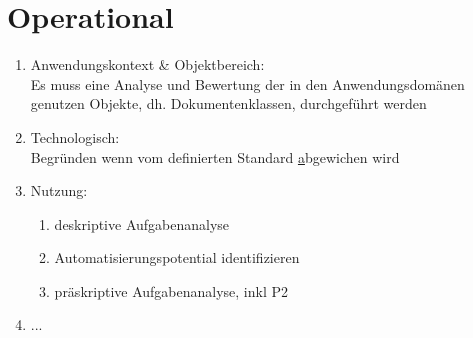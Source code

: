 %
\section{Operational}
\label{sec:zielhierarchie-operational}

\begin{enumerate}
%
\item Anwendungskontext \& Objektbereich:\\
Es muss eine Analyse und Bewertung der in den Anwendungsdomänen genutzen Objekte, dh. Dokumentenklassen, durchgeführt werden
\item Technologisch:\\
Begründen wenn vom definierten Standard \href{sec:entscheidungen} abgewichen wird
\item Nutzung:\\
\begin{enumerate}
\item deskriptive Aufgabenanalyse
\item Automatisierungspotential identifizieren
\item präskriptive Aufgabenanalyse, inkl P2
\end{enumerate}
\item ...
\end{enumerate}




